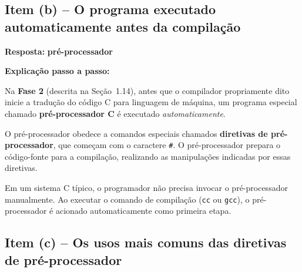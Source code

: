 \documentclass[12pt,a4paper]{article}
\begin{document}
\bigskip

\subsection*{Item (b) -- O programa executado automaticamente antes da compilação}

\begin{respostabox}
\textbf{Resposta:} \textcolor{deitelblue}{\textbf{pré-processador}}

\medskip
\textbf{Explicação passo a passo:}

Na \textbf{Fase 2} (descrita na Seção~1.14), antes que o compilador propriamente dito
inicie a tradução do código C para linguagem de máquina, um programa especial chamado
\textbf{pré-processador C} é executado \textit{automaticamente}.

O pré-processador obedece a comandos especiais chamados \textbf{diretivas de
pré-processador}, que começam com o caractere \texttt{\#}. O pré-processador prepara
o código-fonte para a compilação, realizando as manipulações indicadas por essas
diretivas.

\begin{boaprática}
  Em um sistema C típico, o programador não precisa invocar o pré-processador
  manualmente. Ao executar o comando de compilação (\texttt{cc} ou \texttt{gcc}),
  o pré-processador é acionado automaticamente como primeira etapa.
\end{boaprática}
\end{respostabox}

\bigskip

\subsection*{Item (c) -- Os usos mais comuns das diretivas de pré-processador}
\end{document}
